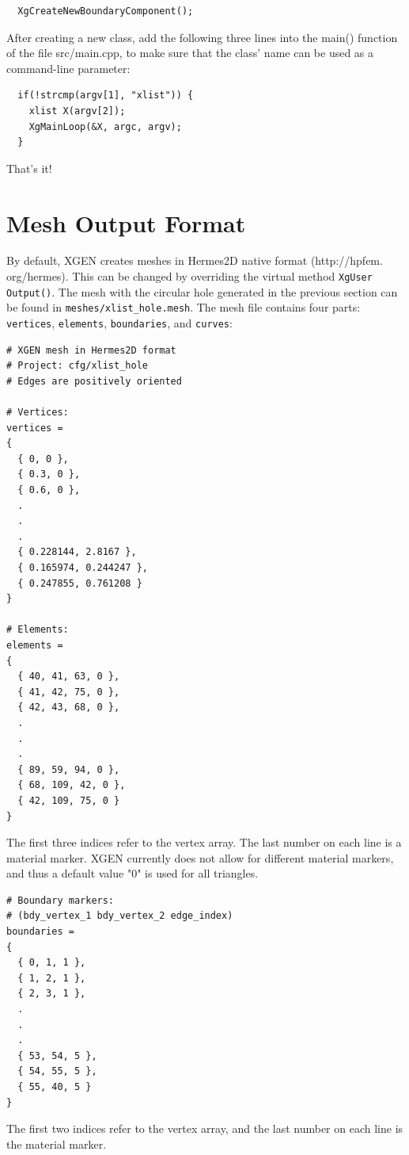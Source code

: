 \documentclass[12pt]{article}
\begin{document}
\begin{verbatim}
  XgCreateNewBoundaryComponent();
\end{verbatim}

  \noindent
  After creating a new class, add the following three lines into 
  the main() function of the file src/main.cpp, to make sure that 
  the class' name can be used as a command-line parameter:
  \begin{verbatim}
  if(!strcmp(argv[1], "xlist")) {
    xlist X(argv[2]);
    XgMainLoop(&X, argc, argv);
  }
  \end{verbatim}
  That's it! 

  \section{Mesh Output Format} \label{out_form}

  By default, XGEN creates meshes in Hermes2D native format (http://hpfem. org/hermes).
  This can be changed by overriding the virtual method {\tt XgUser Output()}.
  The mesh with the circular hole generated in the previous 
  section can be found in {\tt meshes/xlist\_hole.mesh}. The mesh 
  file contains four parts: {\tt vertices}, {\tt elements}, {\tt boundaries}, and 
  {\tt curves}:

  \begin{verbatim}
# XGEN mesh in Hermes2D format
# Project: cfg/xlist_hole
# Edges are positively oriented

# Vertices:
vertices =
{
  { 0, 0 },
  { 0.3, 0 },
  { 0.6, 0 },
  .
  .
  .
  { 0.228144, 2.8167 },
  { 0.165974, 0.244247 },
  { 0.247855, 0.761208 }
}

# Elements:
elements =
{
  { 40, 41, 63, 0 },
  { 41, 42, 75, 0 },
  { 42, 43, 68, 0 },
  .
  .
  .
  { 89, 59, 94, 0 },
  { 68, 109, 42, 0 },
  { 42, 109, 75, 0 }
}
\end{verbatim}
The first three indices refer to the vertex array.
The last number on each line is a material marker. XGEN currently 
does not allow for different material markers, and thus 
a default value "0" is used for all triangles.

\begin{verbatim}
# Boundary markers:
# (bdy_vertex_1 bdy_vertex_2 edge_index)
boundaries =
{
  { 0, 1, 1 },
  { 1, 2, 1 },
  { 2, 3, 1 },
  .
  .
  .
  { 53, 54, 5 },
  { 54, 55, 5 },
  { 55, 40, 5 }
}
\end{verbatim}
The first two indices refer to the vertex array, and the 
last number on each line is the material marker. 
\end{document}
